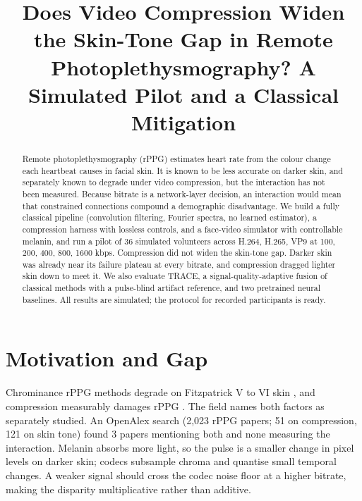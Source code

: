 \documentclass[conference]{IEEEtran}
\begin{document}
\title{Does Video Compression Widen the Skin-Tone Gap in Remote Photoplethysmography? A Simulated Pilot and a Classical Mitigation}

\author{
}

\maketitle

\begin{abstract}
Remote photoplethysmography (rPPG) estimates heart rate from the colour change each heartbeat causes in facial skin. It is known to be less accurate on darker skin, and separately known to degrade under video compression, but the interaction has not been measured. Because bitrate is a network-layer decision, an interaction would mean that constrained connections compound a demographic disadvantage. We build a fully classical pipeline (convolution filtering, Fourier spectra, no learned estimator), a compression harness with lossless controls, and a face-video simulator with controllable melanin, and run a pilot of 36 simulated volunteers across H.264, H.265, VP9 at 100, 200, 400, 800, 1600 kbps. Compression did not widen the skin-tone gap. Darker skin was already near its failure plateau at every bitrate, and compression dragged lighter skin down to meet it. We also evaluate TRACE, a signal-quality-adaptive fusion of classical methods with a pulse-blind artifact reference, and two pretrained neural baselines. All results are simulated; the protocol for recorded participants is ready.
\end{abstract}

\section{Motivation and Gap}
Chrominance rPPG methods degrade on Fitzpatrick V to VI skin \cite{dasari2021,nowara2020}, and compression measurably damages rPPG \cite{mcduff2017,nowara2019}. The field names both factors as separately studied. An OpenAlex search (2,023 rPPG papers; 51 on compression, 121 on skin tone) found 3 papers mentioning both and none measuring the interaction. Melanin absorbs more light, so the pulse is a smaller change in pixel levels on darker skin; codecs subsample chroma and quantise small temporal changes. A weaker signal should cross the codec noise floor at a higher bitrate, making the disparity multiplicative rather than additive.
\end{document}
